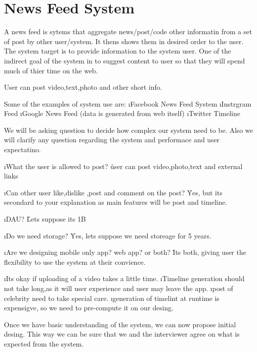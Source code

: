 \chapter{News Feed System}


A news feed is sytems that aggregate news/post/code other informatin from a set of post by other user/system. It thens shows them in desired order to the user. The system target is to provide information to the system user. One of the indirect goal of the system in to suggest content to user so that they will spend much of thier time on the web.

User can post video,text,photo and other short info.


Some of the examples of system use are:
\ls
    \i Facebook News Feed System
    \i Instrgram Feed
    \i Google News Feed (data is generated from web itself)
    \i Twitter Timeline
\le

We will be asking question to decide how complex our system need to be. Also we will clarify any question regarding the system and performace and user expectatino.

\lstart
    \i What the user is allowed to post?
    \r{user can post video,photo,text and external links}

    \i Can other user like,dislike ,post and comment on the post?
    \r{Yes, but its secondard to your explanation as main features will be post and timeline.}

    \i DAU? 
    \r{Lets suppose its 1B}

    \i Do we need storage?
    \r Yes, lets suppose we need storeage for 5 years.

    \i Are we designing mobile only app? web app? or both?
    \r Its both, giving user the flexibility to use the system at their convience.

\lend

\lstart
    \i Its okay if uploading of a video takes a little time.
    \i Timeline generation should not take long,as it will user experience and user may leave the app.
    \i post of celebrity need to take special care.
    \i generation of timelint at runtime is expensigve, so we need to pre-compute it on our desing.
\lend

Once we have basic understanding of the system, we can now propose initial desing. This way we can be sure that we and the interviewer agree on what is expected from the system.

